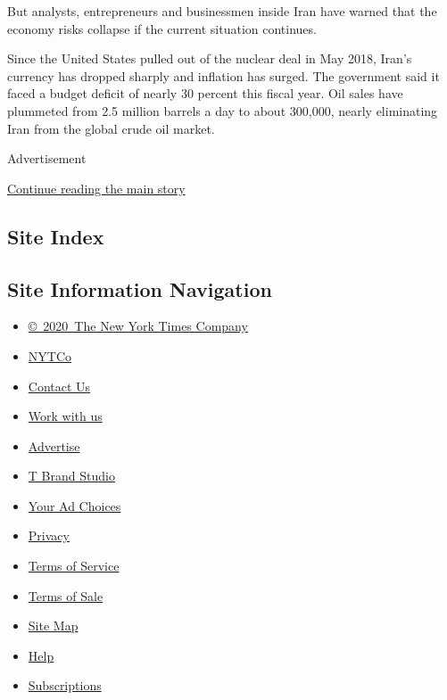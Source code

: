 But analysts, entrepreneurs and businessmen inside Iran have warned that
the economy risks collapse if the current situation continues.

Since the United States pulled out of the nuclear deal in May 2018,
Iran's currency has dropped sharply and inflation has surged. The
government said it faced a budget deficit of nearly 30 percent this
fiscal year. Oil sales have plummeted from 2.5 million barrels a day to
about 300,000, nearly eliminating Iran from the global crude oil market.

Advertisement

\protect\hyperlink{after-bottom}{Continue reading the main story}

\hypertarget{site-index}{%
\subsection{Site Index}\label{site-index}}

\hypertarget{site-information-navigation}{%
\subsection{Site Information
Navigation}\label{site-information-navigation}}

\begin{itemize}
\tightlist
\item
  \href{https://help.nytimes3xbfgragh.onion/hc/en-us/articles/115014792127-Copyright-notice}{©~2020~The
  New York Times Company}
\end{itemize}

\begin{itemize}
\tightlist
\item
  \href{https://www.nytco.com/}{NYTCo}
\item
  \href{https://help.nytimes3xbfgragh.onion/hc/en-us/articles/115015385887-Contact-Us}{Contact
  Us}
\item
  \href{https://www.nytco.com/careers/}{Work with us}
\item
  \href{https://nytmediakit.com/}{Advertise}
\item
  \href{http://www.tbrandstudio.com/}{T Brand Studio}
\item
  \href{https://www.nytimes3xbfgragh.onion/privacy/cookie-policy\#how-do-i-manage-trackers}{Your
  Ad Choices}
\item
  \href{https://www.nytimes3xbfgragh.onion/privacy}{Privacy}
\item
  \href{https://help.nytimes3xbfgragh.onion/hc/en-us/articles/115014893428-Terms-of-service}{Terms
  of Service}
\item
  \href{https://help.nytimes3xbfgragh.onion/hc/en-us/articles/115014893968-Terms-of-sale}{Terms
  of Sale}
\item
  \href{https://spiderbites.nytimes3xbfgragh.onion}{Site Map}
\item
  \href{https://help.nytimes3xbfgragh.onion/hc/en-us}{Help}
\item
  \href{https://www.nytimes3xbfgragh.onion/subscription?campaignId=37WXW}{Subscriptions}
\end{itemize}

